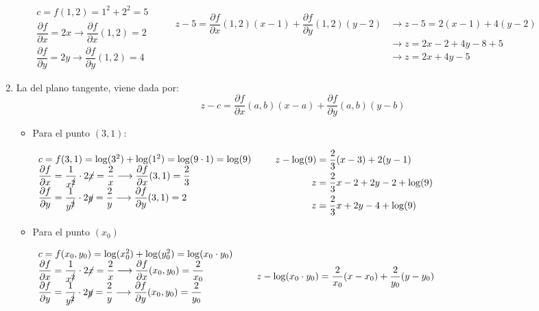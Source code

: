 \begin{enumerate}[label=\c olor{red}\textbf{\arabic*)}, leftmargin=*]
\begin{itemize}
$\begin{array}{l}
c=f(1,2)=1^2+2^2=5\\
\dfrac{\partial f}{\partial x}=2x\longrightarrow\dfrac{\partial f}{\partial x}(1,2)=2\\
\dfrac{\partial f}{\partial y}=2y\longrightarrow\dfrac{\partial f}{\partial y}(1,2)=4
\end{array}\qquad \begin{aligned}
z-5=\dfrac{\partial f}{\partial x}(1,2)(x-1)+\dfrac{\partial f}{\partial y}(1,2)(y-2)&\longrightarrow z-5=2(x-1)+4(y-2)\\
&\longrightarrow z=2x-2+4y-8+5\\
&\longrightarrow z=2x+4y-5
\end{aligned}$
\end{itemize}

\item {}

La del plano tangente, viene dada por: \[ z-c=\dfrac{\partial f}{\partial x}(a,b)(x-a)+\dfrac{\partial f}{\partial y}(a,b)(y-b) \]
\begin{itemize}
\item Para el punto $(3,1)$:

$\begin{array}{l}
c=f(3,1)=\log(3^2)+\log(1^2)=\log(9\cdot1)=\log(9)\\
\dfrac{\partial f}{\partial x}=\dfrac{1}{x^{\cancel{2}}}\cdot 2\cancel{x}=\dfrac{2}{x}\longrightarrow\dfrac{\partial f}{\partial x}(3,1)=\dfrac{2}{3}\\
\dfrac{\partial f}{\partial y}=\dfrac{1}{y^{\cancel{2}}}\cdot 2\cancel{y}=\dfrac{2}{y}\longrightarrow\dfrac{\partial f}{\partial y}(3,1)=2
\end{array}\qquad \begin{aligned}
z-\log(9)&=\dfrac{2}{3}(x-3)+2(y-1)\\
z&=\dfrac{2}{3}x-2+2y-2+\log(9)\\
z&=\dfrac{2}{3}x+2y-4+\log(9)
\end{aligned}$

\item Para el punto $(x_0)$

$\begin{array}{l}
c=f(x_0,y_0)=\log(x_0^2)+\log(y_0^2)=\log(x_0\cdot y_0)\\
\dfrac{\partial f}{\partial x}=\dfrac{1}{x^{\cancel{2}}}\cdot 2\cancel{x}=\dfrac{2}{x}\longrightarrow\dfrac{\partial f}{\partial x}(x_0,y_0)=\dfrac{2}{x_0}\\
\dfrac{\partial f}{\partial y}=\dfrac{1}{y^{\cancel{2}}}\cdot 2\cancel{y}=\dfrac{2}{y}\longrightarrow\dfrac{\partial f}{\partial y}(x_0,y_0)=\dfrac{2}{y_0}
\end{array}\qquad \begin{aligned}
z-\log(x_0\cdot y_0)&=\dfrac{2}{x_0}(x-x_0)+\dfrac{2}{y_0}(y-y_0)\\
\end{aligned}$
\end{itemize}


\end{enumerate}
